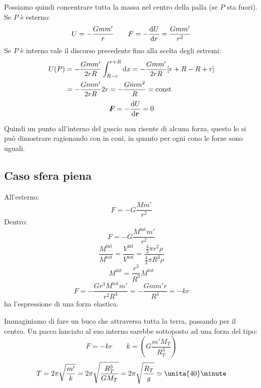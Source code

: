 Possiamo quindi concentrare tutta la massa nel centro della palla (se $P$ sta fuori).
Se $P$ è esterno: 
\[U=-\frac{Gmm'}{r}\qquad F=-\frac{\mathrm{d} U}{\mathrm{d}
r}=\frac{Gmm'}{r^2}\]
Se $P$ è interno vale il discorso precedente fino alla scelta degli
estremi:
\begin{align*}
U(P)&=-\frac{Gmm'}{2rR}\int_{R-r}^{r+R}\mathrm{d} x=-\frac{Gmm'}{2rR}[r+R-R+r]\\
&=-\frac{Gmm'}{2rR}2r=-\frac{Gmm^2}{R}=\text{const}
\end{align*}
\begin{equation*}\boldsymbol{F}=-\frac{\mathrm{d} U}{\mathrm{d} \boldsymbol{r}}=0\end{equation*}

Quindi un punto all'interno del guscio non risente di alcuna
forza, questo lo si può dimostrare ragionando con in coni, in
quanto per ogni cono le forze sono uguali.
\subsection{Caso sfera piena}
All'esterno:
\begin{equation*}F=-G\frac{Mm'}{r^2}\end{equation*}
Dentro:
\begin{equation*}F=-G\frac{M^{\text{int}}m'}{r^2}\end{equation*}
\begin{equation*}\frac{M^{\text{int}}}{M^{\text{tot}}}=\frac{V^{\text{int}}}{V^{\text{tot}}}=\frac{\frac{4}{3}\pi r^2\rho}{\frac{4}{3}\pi R^3\rho}\end{equation*}
\begin{equation*}M^{\text{int}}=\frac{r^3}{R^3}M^{\text{tot}}\end{equation*}
\begin{equation*}F=-\frac{Gr^3M^{\text{tot}}m'}{r^2R^3}=-\frac{Gmm'r}{R^3}=-kr\end{equation*}
ha l'espressione di una forza elastica.

\begin{Es}
Immaginiamo di fare un buco che attraversa tutta la terra, passando per il centro. Un pacco lanciato al suo interno sarebbe sottoposto ad una forza del tipo:
\begin{equation*}F=-kr\qquad k=\left(G\frac{m'M_T}{R_T^3}\right)\end{equation*}
\begin{equation*}T=2\pi\sqrt{\frac{m'}{k}}=2\pi\sqrt{\frac{R_T^3}{GM_T}}=2\pi\sqrt{\frac{R_T}{g}}\simeq \unita{40}\minute\end{equation*}
\end{Es}
